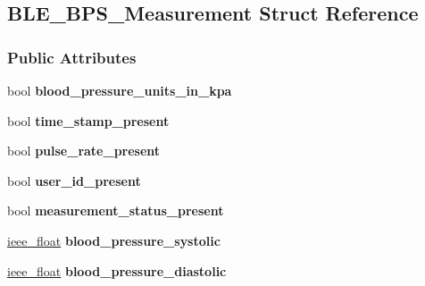 \hypertarget{struct_b_l_e___b_p_s___measurement}{}\subsection{B\+L\+E\+\_\+\+B\+P\+S\+\_\+\+Measurement Struct Reference}
\label{struct_b_l_e___b_p_s___measurement}
\subsubsection*{Public Attributes}
\begin{DoxyCompactItemize}
\item 
bool {\bfseries blood\+\_\+pressure\+\_\+units\+\_\+in\+\_\+kpa}\hypertarget{struct_b_l_e___b_p_s___measurement_ab63ea2cc69cbe61a3c64f666762f8688}{}\label{struct_b_l_e___b_p_s___measurement_ab63ea2cc69cbe61a3c64f666762f8688}

\item 
bool {\bfseries time\+\_\+stamp\+\_\+present}\hypertarget{struct_b_l_e___b_p_s___measurement_ae293dcbcbdfaf7c813f6fbb029dfa2b8}{}\label{struct_b_l_e___b_p_s___measurement_ae293dcbcbdfaf7c813f6fbb029dfa2b8}

\item 
bool {\bfseries pulse\+\_\+rate\+\_\+present}\hypertarget{struct_b_l_e___b_p_s___measurement_ab5de6bde74f880adfa64d9785e8ac848}{}\label{struct_b_l_e___b_p_s___measurement_ab5de6bde74f880adfa64d9785e8ac848}

\item 
bool {\bfseries user\+\_\+id\+\_\+present}\hypertarget{struct_b_l_e___b_p_s___measurement_a021615e1b760aa37eda838a83ffaec0b}{}\label{struct_b_l_e___b_p_s___measurement_a021615e1b760aa37eda838a83ffaec0b}

\item 
bool {\bfseries measurement\+\_\+status\+\_\+present}\hypertarget{struct_b_l_e___b_p_s___measurement_a4cb6b32f5fed3d3995d79122046a1e50}{}\label{struct_b_l_e___b_p_s___measurement_a4cb6b32f5fed3d3995d79122046a1e50}

\item 
\hyperlink{structieee__float}{ieee\+\_\+float} {\bfseries blood\+\_\+pressure\+\_\+systolic}\hypertarget{struct_b_l_e___b_p_s___measurement_ac662746a0640b9646953bf2318e95f02}{}\label{struct_b_l_e___b_p_s___measurement_ac662746a0640b9646953bf2318e95f02}

\item 
\hyperlink{structieee__float}{ieee\+\_\+float} {\bfseries blood\+\_\+pressure\+\_\+diastolic}\hypertarget{struct_b_l_e___b_p_s___measurement_a54fd3e94e76d0fecca16adbc16cf3d34}{}\label{struct_b_l_e___b_p_s___measurement_a54fd3e94e76d0fecca16adbc16cf3d34}


\end{DoxyCompactItemize}
